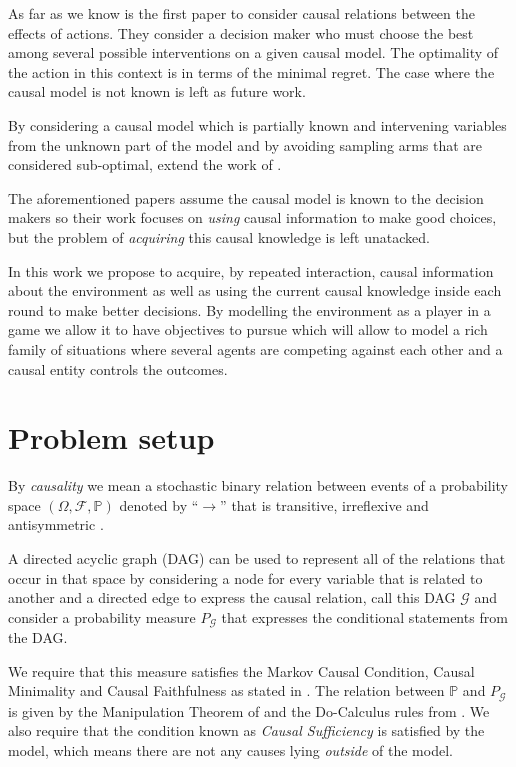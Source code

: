 \documentclass{article}
\begin{document}
As far as we know \cite{lattimoreNIPS2016} is the first paper to consider causal relations between the effects of actions. They consider a decision maker who must choose the best among several possible interventions on a given causal model. The optimality of the action in this context is in terms of the minimal regret. The case where the causal model is not known is left as future work.

By considering a causal model which is partially known and intervening variables from the unknown part of the model and by avoiding sampling arms that are considered sub-optimal, \cite{sen2017identifying} extend the work of \cite{lattimoreNIPS2016}.

The aforementioned papers assume the causal model is known to the decision makers so their work focuses on \textit{using} causal information to make good choices, but the problem of \textit{acquiring} this causal knowledge is left unatacked.

In this work we propose to acquire, by repeated interaction, causal information about the environment as well as using the current causal knowledge inside each round to make better decisions. By modelling the environment as a player in a game we allow it to have objectives to pursue which will allow to model a rich family of situations where several agents are competing against each other and a causal entity controls the outcomes. 

\section{Problem setup}{\label{problem_setup}}
By \textit{causality} we mean a stochastic binary relation between events of a probability space $(\Omega, \mathcal{F}, \mathbb{P})$ denoted by $“\to”$ that is transitive, irreflexive and antisymmetric \cite{spirtes2000causation}. 

A directed acyclic graph (DAG) can be used to represent all of the relations that occur in that space by considering a node for every variable that is related to another and a directed edge to express the causal relation, call this DAG $\mathcal{G}$ and consider a probability measure $P_{\mathcal{G}}$ that expresses the conditional statements from the DAG. 

We require that this measure satisfies the Markov Causal Condition, Causal Minimality and Causal Faithfulness as stated in \cite{spirtes2000causation}. The relation between $\mathbb{P}$ and $P_{\mathcal{G}}$ is given by the Manipulation Theorem of \cite{spirtes2000causation} and the Do-Calculus rules from \cite{pearl2009causality}. We also require that the condition known as \textit{Causal Sufficiency} is satisfied by the model, which means there are not any causes lying \textit{outside} of the model. 
\end{document}
